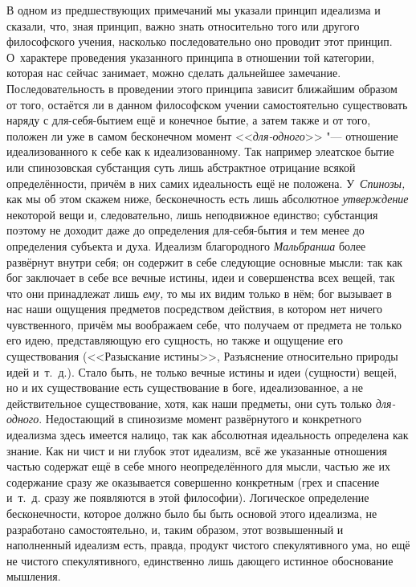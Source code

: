 В одном из предшествующих примечаний мы указали принцип идеализма и сказали,
что, зная принцип, важно знать относительно того или другого философского
учения, насколько последовательно оно проводит этот принцип. О~характере
проведения указанного принципа в отношении той категории, которая нас
сейчас занимает, можно сделать дальнейшее замечание. Последовательность в
проведении этого принципа зависит ближайшим образом от того, остаётся ли в
данном философском учении самостоятельно существовать наряду с
для-себя-бытием ещё и конечное бытие, а затем также и от того, положен ли
уже в самом бесконечном момент <<{\em для-одного}>>
"--- отношение идеализованного к себе как к идеализованному. Так например
элеатское бытие или спинозовская субстанция суть лишь абстрактное отрицание
всякой определённости, причём в них самих идеальность ещё не положена.
У~{\em Спинозы,} как мы об этом скажем ниже,
бесконечность есть лишь абсолютное {\em утверждение}
некоторой вещи и, следовательно, лишь неподвижное единство; субстанция
поэтому не доходит даже до определения для-себя-бытия и тем менее до
определения субъекта и духа. Идеализм благородного
{\em Мальбранша} более развёрнут внутри себя; он
содержит в себе следующие основные мысли: так как бог заключает в себе все
вечные истины, идеи и совершенства всех вещей, так что они принадлежат лишь
{\em ему,} то мы их видим только в нём; бог вызывает в
нас наши ощущения предметов посредством действия, в котором нет ничего
чувственного, причём мы воображаем себе, что получаем от предмета не только
его идею, представляющую его сущность, но также и ощущение его
существования (<<Разыскание истины>>, Разъяснение относительно природы идей
и~т.~д.). Стало быть, не только вечные истины и идеи (сущности) вещей, но и
их существование есть существование в боге, идеализованное, а не
действительное существование, хотя, как наши предметы, они суть только
{\em для-одного}. Недостающий в спинозизме момент
развёрнутого и конкретного идеализма здесь имеется налицо, так как
абсолютная идеальность определена как знание. Как ни чист и ни глубок этот
идеализм, всё же указанные отношения частью содержат ещё в себе много
неопределённого для мысли, частью же их содержание сразу же оказывается
совершенно конкретным (грех и спасение и~т.~д. сразу же появляются в этой
философии). Логическое определение бесконечности, которое должно было бы
быть основой этого идеализма, не разработано самостоятельно, и, таким
образом, этот возвышенный и наполненный идеализм есть, правда, продукт
чистого спекулятивного ума, но ещё не чистого спекулятивного, единственно
лишь дающего истинное обоснование мышления.

